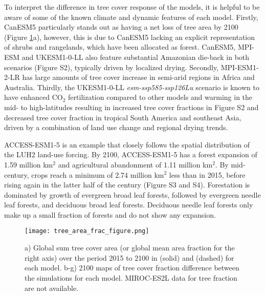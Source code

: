 \documentclass[draft]{agujournal2019}
\begin{document}
To interpret the difference in tree cover response of the models, it is helpful to be aware of some of the known climate and dynamic features of each model.
Firstly, CanESM5 particularly stands out as having a net loss of tree area by 2100 (Figure \ref{fig:land_use_map}a), however, this is due to CanESM5 lacking an explicit representation of shrubs and rangelands, which have been allocated as forest.
 CanESM5, MPI-ESM and UKESM1-0-LL also feature substantial Amazonian die-back in both scenarios (Figure S2), typically driven by localized drying.
Secondly, MPI-ESM1-2-LR has large amounts of tree cover increase in semi-arid regions in Africa and Australia.
Thirdly, the UKESM1-0-LL \textit{esm-ssp585-ssp126Lu} scenario is known to have enhanced CO$_2$ fertilization compared to other models and warming in the mid- to high-latitudes resulting in increased tree cover fractions in Figure S2 and decreased tree cover fraction in tropical South America and southeast Asia, driven by a combination of land use change and regional drying trends.

ACCESS-ESM1-5 is an example that closely follows the spatial distribution of the LUH2 land-use forcing.
By 2100, ACCESS-ESM1-5 has a forest expansion of 1.59 million km$^2$ and agricultural abandonment of 1.11 million km$^2$.
By mid-century, crops reach a minimum of 2.74 million km$^2$ less than in 2015, before rising again in the latter half of the century (Figure S3 and S4).
Forestation is dominated by growth of evergreen broad leaf forests, followed by evergreen needle leaf forests, and deciduous broad leaf forests.
Deciduous needle leaf forests only make up a small fraction of forests and do not show any expansion.

\begin{figure}
    \texttt{[image: tree\_area\_frac\_figure.png]}
    \caption{a) Global sum tree cover area (or global mean area fraction for the right axis) over the period 2015 to 2100 in  (solid) and  (dashed) for each model. b-g) 2100 maps of tree cover fraction difference between the simulations for each model. MIROC-ES2L data for tree fraction are not available.}
    \label{fig:land_use_map}
\end{figure}
\end{document}
